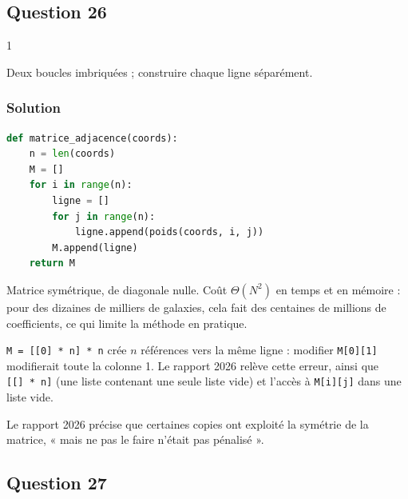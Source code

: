 \documentclass[11pt,a4paper]{article}
\begin{document}
\hypertarget{question-26}{%
\subsection{Question 26}\label{question-26}}

\begin{indication}{1}

Deux boucles imbriquées ; construire chaque ligne séparément.

\end{indication}

\hypertarget{solution-25}{%
\subsubsection{Solution}\label{solution-25}}

\begin{lstlisting}[language=Python]
def matrice_adjacence(coords):
    n = len(coords)
    M = []
    for i in range(n):
        ligne = []
        for j in range(n):
            ligne.append(poids(coords, i, j))
        M.append(ligne)
    return M
\end{lstlisting}

Matrice symétrique, de diagonale nulle. Coût \(\Theta(N^2)\) en temps et en mémoire : pour des dizaines de milliers de galaxies, cela fait des centaines de millions de coefficients, ce qui limite la méthode en pratique.

\begin{piege}

\texttt{M\ =\allowbreak{}\ {[}{[}0{]}\allowbreak{}\ *\ n{]}\allowbreak{}\ *\ n} crée \(n\) références vers la même ligne : modifier \texttt{M{[}0{]}{[}1{]}} modifierait toute la colonne 1. Le rapport 2026 relève cette erreur, ainsi que \texttt{{[}{[}{]}\ *\ n{]}} (une liste contenant une seule liste vide) et l'accès à \texttt{M{[}i{]}{[}j{]}} dans une liste vide.

\end{piege}

\begin{jury}

Le rapport 2026 précise que certaines copies ont exploité la symétrie de la matrice, « mais ne pas le faire n'était pas pénalisé ».

\end{jury}

\hypertarget{question-27}{%
\subsection{Question 27}\label{question-27}}
\end{document}
